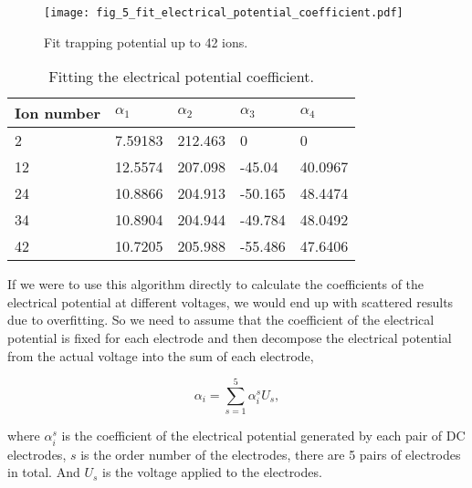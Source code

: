 \begin{figure}
    \centering
    \texttt{[image: fig\_5\_fit\_electrical\_potential\_coefficient.pdf]}
    \caption{Fit trapping potential up to 42 ions.}
    \label{fig:fit_electrical_potential_coefficient}
\end{figure}

\begin{table}
    \centering
    \caption{Fitting the electrical potential coefficient.}
    \begin{tabular}{lllll}
        \toprule
        Ion number & $\alpha_1$ & $\alpha_2$ & $\alpha_3$ & $\alpha_4$ \\
        \midrule
        2          & 7.59183    & 212.463    & 0          & 0          \\
        12         & 12.5574    & 207.098    & -45.04     & 40.0967    \\
        24         & 10.8866    & 204.913    & -50.165    & 48.4474    \\
        34         & 10.8904    & 204.944    & -49.784    & 48.0492    \\
        42         & 10.7205    & 205.988    & -55.486    & 47.6406    \\
        \bottomrule
    \end{tabular}
    \label{tab:fitting_the_electrical_potential_coefficient}
\end{table}

If we were to use this algorithm directly to calculate the coefficients of the electrical potential at different voltages, we would end up with scattered results due to overfitting. So we need to assume that the coefficient of the electrical potential is fixed for each electrode and then decompose the electrical potential from the actual voltage into the sum of each electrode,

\begin{equation}
    \alpha_i=\sum_{s=1}^5 \alpha_i^s U_s,
\end{equation}

where $\alpha_i^s$ is the coefficient of the electrical potential generated by each pair of DC electrodes, $s$ is the order number of the electrodes, there are 5 pairs of electrodes in total. And $U_s$ is the voltage applied to the electrodes.

